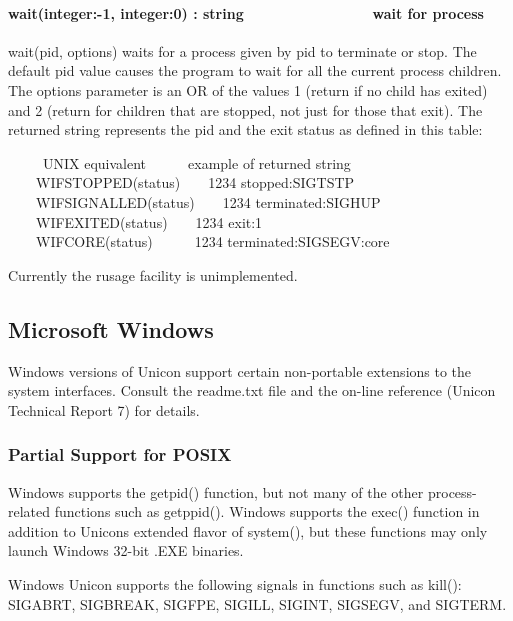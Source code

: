 \paragraph[wait(integer:{}-1, integer:0) : string\ \ \ \ \ \ \ \ \ \ 
\ \ \ \ \ \ wait for process]{wait(integer:-1, integer:0) :
string\ \ \ \ \ \ \ \ \ \  \ \ \ \ \ \ wait for process}
wait(pid, options) waits for a process given by pid to terminate or
stop. The default pid value causes the program to wait for all the
current process{\textquotesingle} children. The options parameter is an
OR of the values 1 (return if no child has exited) and 2 (return for
children that are stopped, not just for those that exit). The returned
string represents the pid and the exit status as defined in this table:


\ \ \ \ \ UNIX equivalent\ \ \ \ \ \ example of returned string\\
 \ \ \ \ WIFSTOPPED(status)\ \ \ \ {\textquotedbl}1234
stopped:SIGTSTP{\textquotedbl} \\
 \ \ \ \ WIFSIGNALLED(status)\ \ \ \ {\textquotedbl}1234
terminated:SIGHUP{\textquotedbl} \\
 \ \ \ \ WIFEXITED(status)\ \ \ \ {\textquotedbl}1234
exit:1{\textquotedbl} \\
 \ \ \ \ WIFCORE(status)\ \ \ \ \ \ {\textquotedbl}1234
terminated:SIGSEGV:core{\textquotedbl} 

Currently the \textsf{rusage} facility is unimplemented.

\subsection[Microsoft Windows]{Microsoft Windows}
Windows versions of Unicon support certain non-portable extensions to
the system interfaces. Consult the readme.txt file and the on-line
reference (Unicon Technical Report 7) for details.

\subsubsection{Partial Support for POSIX}
Windows supports the getpid() function, but not many of the other
process-related functions such as getppid(). Windows supports the
exec() function in addition to Unicon{\textquotesingle}s extended
flavor of system(), but these functions may only launch Windows 32-bit
.EXE binaries.

Windows Unicon supports the following signals in functions such as
kill(): SIGABRT, SIGBREAK, SIGFPE, SIGILL, SIGINT, SIGSEGV, and
SIGTERM.

